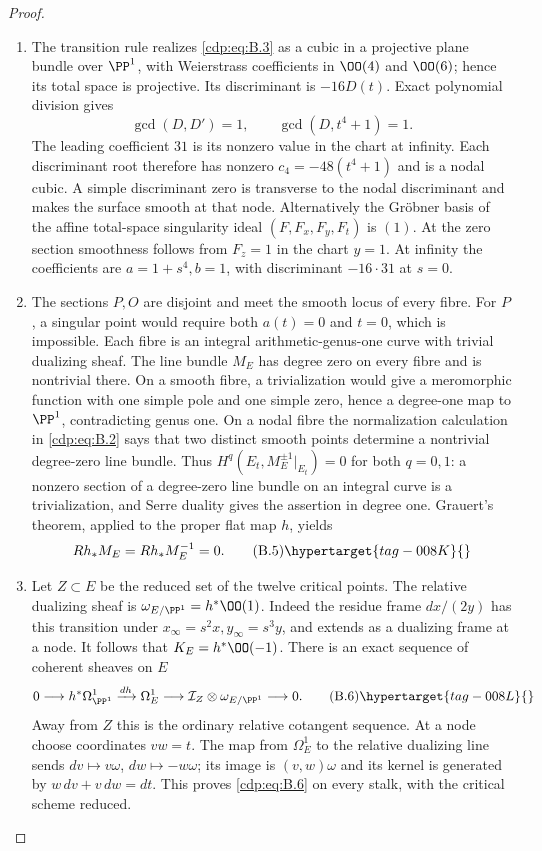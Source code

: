 \begin{proof}

\begin{enumerate}[label=\arabic*.,leftmargin=*]
\item The transition rule realizes \eqref{cdp:eq:B.3} as a cubic in a projective plane bundle over $\PP^1$, with Weierstrass coefficients in $\OO(4)$ and $\OO(6)$; hence its total space is projective. Its discriminant is $-16D(t)$. Exact polynomial division gives
\[
 \gcd(D,D')=1,\qquad \gcd(D,t^4+1)=1.
\]
The leading coefficient $31$ is its nonzero value in the chart at infinity. Each discriminant root therefore has nonzero $c_4=-48(t^4+1)$ and is a nodal cubic. A simple discriminant zero is transverse to the nodal discriminant and makes the surface smooth at that node. Alternatively the Gr\"obner basis of the affine total-space singularity ideal $(F,F_x,F_y,F_t)$ is $(1)$. At the zero section smoothness follows from $F_z=1$ in the chart $y=1$. At infinity the coefficients are $a=1+s^4,b=1$, with discriminant $-16\cdot31$ at $s=0$.

\item The sections $P,O$ are disjoint and meet the smooth locus of every fibre. For $P$, a singular point would require both $a(t)=0$ and $t=0$, which is impossible. Each fibre is an integral arithmetic-genus-one curve with trivial dualizing sheaf. The line bundle $M_E$ has degree zero on every fibre and is nontrivial there. On a smooth fibre, a trivialization would give a meromorphic function with one simple pole and one simple zero, hence a degree-one map to $\PP^1$, contradicting genus one. On a nodal fibre the normalization calculation in \eqref{cdp:eq:B.2} says that two distinct smooth points determine a nontrivial degree-zero line bundle. Thus $H^q(E_t,M_E^{\pm1}|_{E_t})=0$ for both $q=0,1$: a nonzero section of a degree-zero line bundle on an integral curve is a trivialization, and Serre duality gives the assertion in degree one. Grauert's theorem, applied to the proper flat map $h$, yields
\[
 Rh_*M_E=Rh_*M_E^{-1}=0.                               \tag{B.5}\hypertarget{tag-008K}{}\label{cdp:eq:B.5}
\]

\item Let $Z\subset E$ be the reduced set of the twelve critical points. The relative dualizing sheaf is $\omega_{E/\PP^1}=h^*\OO(1)$. Indeed the residue frame $dx/(2y)$ has this transition under $x_\infty=s^2x,y_\infty=s^3y$, and extends as a dualizing frame at a node. It follows that $K_E=h^*\OO(-1)$. There is an exact sequence of coherent sheaves on $E$
\[
0\longrightarrow h^*\Omega^1_{\PP^1}
 \xrightarrow{dh}\Omega^1_E
 \longrightarrow\mathcal I_Z\otimes\omega_{E/\PP^1}
 \longrightarrow0.                                   \tag{B.6}\hypertarget{tag-008L}{}\label{cdp:eq:B.6}
\]
Away from $Z$ this is the ordinary relative cotangent sequence. At a node choose coordinates $vw=t$. The map from $\Omega^1_E$ to the relative dualizing line sends $dv\mapsto v\omega$, $dw\mapsto-w\omega$; its image is $(v,w)\omega$ and its kernel is generated by $w\,dv+v\,dw=dt$. This proves \eqref{cdp:eq:B.6} on every stalk, with the critical scheme reduced.


\end{enumerate}
\end{proof}
